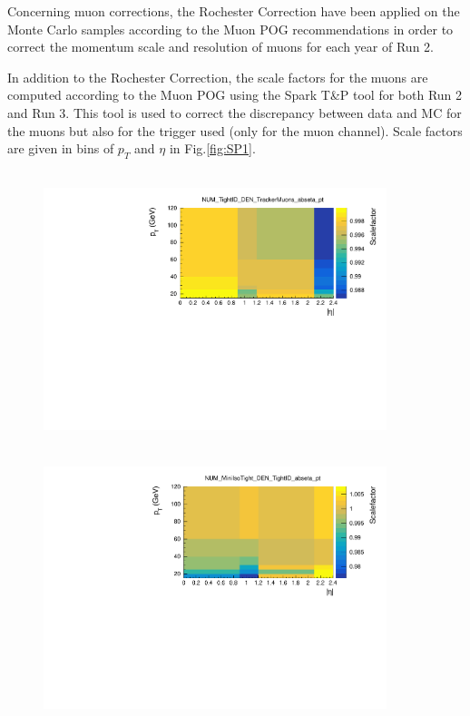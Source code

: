 \documentclass{cernatlasnote}
\begin{document}
Concerning muon corrections, the Rochester Correction \cite{ROCCOR} have been applied on the Monte Carlo samples according to the Muon POG recommendations in order to correct the momentum scale and resolution of muons for each year of Run 2.

    In addition to the Rochester Correction, the scale factors for the muons are computed according to the Muon POG \cite{MuonSpark1}\cite{MuonSpark2} using the Spark T\&P tool for both Run 2 and Run 3. This tool is used to correct the discrepancy between data and MC for the muons but also for the trigger used (only for the muon channel). Scale factors are given in bins of $p_T$ and $\eta$ in Fig.\ref{fig:SP1}.
    \label{Spark}

\begin{figure}
    \centering
    \includegraphics[height=8cm, width=10cm, trim= 0cm 0cm 0cm 0.cm,clip]{images/Muon/NUM_TightID_DEN_TrackerMuons.pdf}
    \includegraphics[height=8cm, width=10cm, trim= 0cm 0cm 0cm 0.cm,clip]{images/Muon/NUM_MiniIsoTight_DEN_TightID.pdf}

\end{figure}
\end{document}
